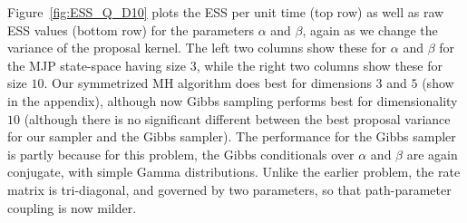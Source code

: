Figure~\ref{fig:ESS_Q_D10} plots the ESS per unit time (top row) as well as raw ESS values (bottom row) for the parameters $\alpha$ and $\beta$, again as we change the variance of the proposal kernel. 
The left two columns show these for $\alpha$ and $\beta$ for the MJP state-space having size $3$, while the right two columns show these for size $10$.
Our symmetrized  MH algorithm does best for dimensions $3$ and $5$ (show in the appendix), although now Gibbs sampling performs best for dimensionality $10$ (although there is no significant different between the best proposal variance for our sampler and the Gibbs sampler).
The performance for the Gibbs sampler is partly because for this problem, the Gibbs conditionals over $\alpha$ and $\beta$ are again conjugate, with simple Gamma distributions. Unlike the earlier problem, the rate matrix is tri-diagonal, and governed by two parameters, so that path-parameter coupling is now milder.
